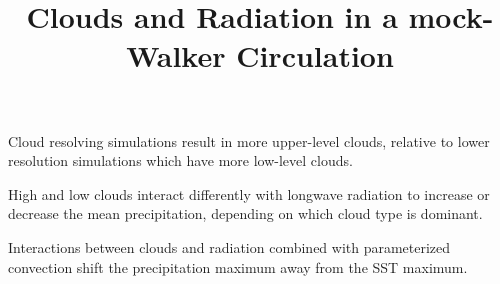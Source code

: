 \documentclass[draft]{agujournal2019}
\begin{document}
\title{Clouds and Radiation in a mock-Walker Circulation}



\begin{keypoints}
  \item{Cloud resolving simulations result in more upper-level clouds, relative to lower resolution simulations which have more low-level clouds.}
  \item{High and low clouds interact differently with longwave radiation to increase or decrease the mean precipitation, depending on which cloud type is dominant.}
  \item{Interactions between clouds and radiation combined with parameterized convection shift the precipitation 
  maximum away from the SST maximum.}
\end{keypoints}
\end{document}
